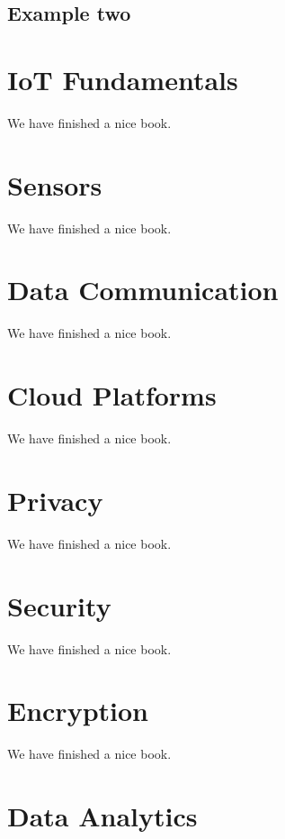 \documentclass[]{book}
\theoremstyle{definition}
\theoremstyle{definition}
\theoremstyle{remark}
\begin{document}
\section{Example two}\label{example-two}

\chapter{IoT Fundamentals}\label{fundamentals}

We have finished a nice book.

\chapter{Sensors}\label{sensors}

We have finished a nice book.

\chapter{Data Communication}\label{communications}

We have finished a nice book.

\chapter{Cloud Platforms}\label{platforms}

We have finished a nice book.

\chapter{Privacy}\label{privacy}

We have finished a nice book.

\chapter{Security}\label{security}

We have finished a nice book.

\chapter{Encryption}\label{encryption}

We have finished a nice book.

\chapter{Data Analytics}\label{analytics}
\end{document}
